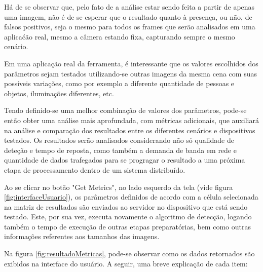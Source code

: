 Há de se observar que, pelo fato de a análise estar sendo feita a partir de apenas uma imagem, não é de se esperar que o resultado quanto à presença, ou não, de falsos positivos, seja o mesmo para todos os frames que serão analisados em uma aplicaćão real, mesmo a câmera estando fixa, capturando sempre o mesmo cenário.

Em uma aplicação real da ferramenta, é interessante que os valores escolhidos dos parâmetros sejam testados utilizando-se outras imagens da mesma cena com suas possíveis variações, como por exemplo a diferente quantidade de pessoas e objetos, iluminações diferentes, etc.

Tendo definido-se uma melhor combinação de valores dos parâmetros, pode-se então obter uma análise mais aprofundada, com métricas adicionais, que auxiliará na análise e comparação dos resultados entre os diferentes cenários e dispositivos testados. Os resultados serão analisados considerando não só qualidade de deteção e tempo de reposta, como também a demanda de banda em rede e quantidade de dados trafegados para se progragar o resultado a uma próxima etapa de processamento dentro de um sistema distribuído.

Ao se clicar no botão "Get Metrics", no lado esquerdo da tela (vide figura \ref{fig:interfaceUsuario}), os parâmetros definidos de acordo com a célula selecionada na matriz de resultados são enviados ao servidor no dispositivo que está sendo testado. Este, por sua vez, executa novamente o algoritmo de detecção, logando também o tempo de execução de outras etapas preparatórias, bem como outras informações referentes aos tamanhos das imagens.

Na figura \ref{fig:resultadoMetricas}, pode-se observar como os dados retornados são exibidos na interface do usuário. A seguir, uma breve explicação de cada item:

